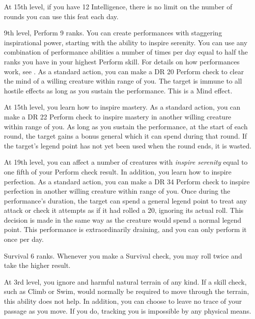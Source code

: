     At 15th level, if you have 12 Intelligence, there is no limit on the number of rounds you can use this feat each day.

    \featpres 9th level, Perform 9 ranks.
    \featben You can create performances with staggering inspirational power, starting with the ability to inspire serenity.
    You can use any combination of performance abilities a number of times per day equal to half the ranks you have in your highest Perform skill.
    For details on how performances work, see .
     As a standard action, you can make a DR 20 Perform check to clear the mind of a willing creature within \rngmed range of you.
    The target is immune to all hostile  effects as long as you sustain the performance.
    This is a Mind effect.

    At 15th level, you learn how to inspire mastery.
     As a standard action, you can make a DR 22 Perform check to inspire mastery in another willing creature within \rngmed range of you.
    As long as you sustain the performance, at the start of each round, the target gains a bonus general  which it can spend during that round.
    If the target's legend point has not yet been used when the round ends, it is wasted.

    At 19th level, you can affect a number of creatures with \textit{inspire serenity} equal to one fifth of your Perform check result.
    In addition, you learn how to inspire perfection.
     As a standard action, you can make a DR 34 Perform check to inspire perfection in another willing creature within \rngmed range of you.
    Once during the performance's duration, the target can spend a general legend point to treat any attack or check it attempts as if it had rolled a 20, ignoring its actual roll.
    This decision is made in the same way as the creature would spend a normal legend point.
    This performance is extraordinarily draining, and you can only perform it once per day.

    \featpre Survival 6 ranks.
    \featben Whenever you make a Survival check, you may roll twice and take the higher result.

    At 3rd level, you ignore  and harmful natural terrain of any kind.
    If a skill check, such as Climb or Swim, would normally be required to move through the terrain, this ability does not help.
    In addition, you can choose to leave no trace of your passage as you move.
    If you do, tracking you is impossible by any physical means.

